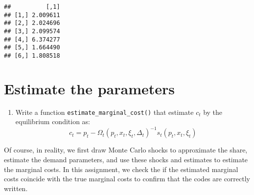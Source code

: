 \documentclass[
]{book}
\newenvironment{Shaded}{\begin{snugshade}}{\end{snugshade}}
\newcommand{\AttributeTok}[1]{\textcolor[rgb]{0.13,0.29,0.53}{#1}}
\newcommand{\CommentTok}[1]{\textcolor[rgb]{0.56,0.35,0.01}{\textit{#1}}}
\newcommand{\DecValTok}[1]{\textcolor[rgb]{0.00,0.00,0.81}{#1}}
\newcommand{\FunctionTok}[1]{\textcolor[rgb]{0.13,0.29,0.53}{\textbf{#1}}}
\newcommand{\NormalTok}[1]{#1}
\newcommand{\OtherTok}[1]{\textcolor[rgb]{0.56,0.35,0.01}{#1}}
\newcommand{\SpecialCharTok}[1]{\textcolor[rgb]{0.81,0.36,0.00}{\textbf{#1}}}
\providecommand{\tightlist}{%
  \setlength{\itemsep}{0pt}\setlength{\parskip}{0pt}}
\begin{document}
\begin{verbatim}
##          [,1]
## [1,] 2.009611
## [2,] 2.024696
## [3,] 2.099574
## [4,] 6.374277
## [5,] 1.664490
## [6,] 1.808518
\end{verbatim}

\hypertarget{estimate-the-parameters-3}{%
\section{Estimate the parameters}\label{estimate-the-parameters-3}}

\begin{enumerate}
\def\labelenumi{\arabic{enumi}.}
\tightlist
\item
  Write a function \texttt{estimate\_marginal\_cost()} that estimate \(c_t\) by the equilibrium condition as:
  \[
  c_t = p_t - \Omega_t(p_t, x_t, \xi_t, \Delta_t)^{-1} s_t(p_t, x_t, \xi_t)
  \]
\end{enumerate}

Of course, in reality, we first draw Monte Carlo shocks to approximate the share, estimate the demand parameters, and use these shocks and estimates to estimate the marginal costs. In this assignment, we check the if the estimated marginal costs coincide with the true marginal costs to confirm that the codes are correctly written.

\begin{Shaded}
\end{Shaded}
\end{document}
